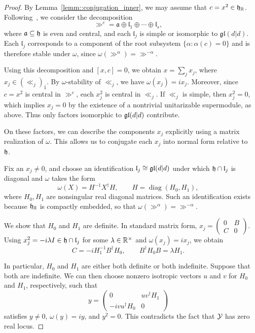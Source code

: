 \begin{proof}

By Lemma~\ref{lemm::conjugation_inner}, we may assume that $c=x^2\in{\mathfrak h}_{{\mathbb R}}$. Following~\cite[proof of Lemma~3.9]{Sherman2025}, we consider the decomposition
\[
\gg^c=\mathfrak a\oplus\mathfrak l_1\oplus\cdots\oplus\mathfrak l_s,
\]
where $\mathfrak a\subseteq{\mathfrak h}$ is even and central, and each $\mathfrak l_j$ is simple or isomorphic to $\mathfrak{gl}(d\vert d)$. Each $\mathfrak l_j$ corresponds to a component of the root subsystem $\{\alpha:\alpha(c)=0\}$ and is therefore stable under $\omega$, since $\omega(\gg^\alpha)=\gg^{-\alpha}$.


Using this decomposition and $[x,c]=0$, we obtain $x=\sum_jx_j$, where $x_j\in(\ll_j)_{\bar1}$. By $\omega$-stability of $\ll_j$, we have $\omega(x_j)=ix_j$. Moreover, since $c=x^2$ is central in $\gg^c$, each $x_j^2$ is central in $\ll_j$. If $\ll_j$ is simple, then $x_j^2=0$, which implies $x_j=0$ by the existence of a nontrivial unitarizable supermodule, as above. Thus only factors isomorphic to ${\mathfrak{gl}}(d\vert d)$ contribute.


On these factors, we can describe the components $x_j$ explicitly using a matrix realization of $\omega$. This allows us to conjugate each $x_j$ into normal form relative to ${\mathfrak h}$. 

Fix an $x_j\neq0$, and 
choose an identification ${\mathfrak l}_j\cong{\mathfrak{gl}}(d\vert d)$ under which ${\mathfrak h}\cap{\mathfrak l}_j$ is diagonal and $\omega$ takes the form
\[
\omega(X)=H^{-1}X^\dagger H,\qquad H=\operatorname{diag}(H_0,H_1),
\]
where $H_0,H_1$ are nonsingular real diagonal matrices. Such an identification exists because ${\mathfrak h}_{\mathbb R}$ is compactly embedded, so that $\omega(\gg^{\alpha})=\gg^{-\alpha}$. 



We show that $H_0$ and $H_1$ are definite. 
In standard matrix form, $x_j=\left(\begin{smallmatrix}0&B\\C&0\end{smallmatrix}\right)$.  Using $x_j^2=-i\lambda I\in{\mathfrak h}\cap{\mathfrak l}_j$ for some $\lambda\in{\mathbb R}^\times$ and $\omega(x_j)=ix_j$, we obtain
\[
C=-iH_1^{-1}B^\dagger H_0,\qquad B^\dagger H_0B=\lambda H_1.
\]

In particular, $H_0$ and $H_1$ are either both definite or both indefinite. Suppose that both are indefinite. We can then choose nonzero isotropic vectors $u$ and $v$ for $H_0$ and $H_1$, respectively, such that
\[
y=\begin{pmatrix}0&uv^\dagger H_1\\-i vu^\dagger H_0&0\end{pmatrix}
\]
satisfies $y\neq0$, $\omega(y)=iy$, and $y^2=0$. This contradicts the fact that ${\mathcal Y}$ has zero real locus. 



\end{proof}
